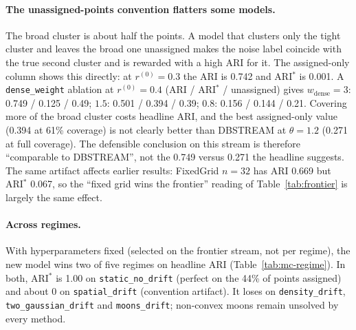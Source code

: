 \documentclass[11pt]{article}
\begin{document}
\paragraph{The unassigned-points convention flatters some models.} The broad cluster is about half the points. A model that clusters only the tight cluster and leaves the broad one unassigned makes the noise label coincide with the true second cluster and is rewarded with a high ARI for it. The assigned-only column shows this directly: at $r^{(0)}{=}0.3$ the ARI is 0.742 and ARI$^*$ is 0.001. A \texttt{dense\_weight} ablation at $r^{(0)}{=}0.4$ (ARI / ARI$^*$ / unassigned) gives $w_{\text{dense}}{=}3$: 0.749 / 0.125 / 0.49; $1.5$: 0.501 / 0.394 / 0.39; $0.8$: 0.156 / 0.144 / 0.21. Covering more of the broad cluster costs headline ARI, and the best assigned-only value (0.394 at 61\% coverage) is not clearly better than DBSTREAM at $\theta{=}1.2$ (0.271 at full coverage). The defensible conclusion on this stream is therefore ``comparable to DBSTREAM'', not the 0.749 versus 0.271 the headline suggests. The same artifact affects earlier results: FixedGrid $n{=}32$ has ARI 0.669 but ARI$^*$ 0.067, so the ``fixed grid wins the frontier'' reading of Table~\ref{tab:frontier} is largely the same effect.

\paragraph{Across regimes.} With hyperparameters fixed (selected on the frontier stream, not per regime), the new model wins two of five regimes on headline ARI (Table~\ref{tab:mc-regime}). In both, ARI$^*$ is 1.00 on \texttt{static\_no\_drift} (perfect on the 44\% of points assigned) and about 0 on \texttt{spatial\_drift} (convention artifact). It loses on \texttt{density\_drift}, \texttt{two\_gaussian\_drift} and \texttt{moons\_drift}; non-convex moons remain unsolved by every method.

\begin{table}[h]
\centering
\caption{ARI by regime ($n=500$, seed 7). The new model uses $r^{(0)}{=}0.4$, DBSTREAM $\theta{=}1.2$.}
\label{tab:mc-regime}
\end{table}
\end{document}
